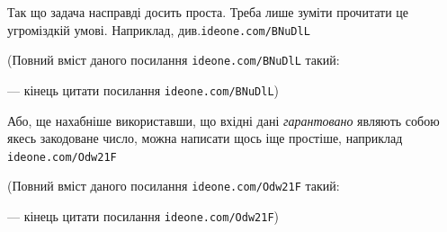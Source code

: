 \documentclass[14pt,a4paper]{extarticle}
\renewcommand{\baselinestretch}{1.3125}
\begin{document}
Так що задача насправді досить проста. Треба лише зуміти прочитати це у\nolinebreak[3] громіздкій умові. Наприклад, див.\nolinebreak[2] 
\verb"ideone.com/BNuDlL"


{\color{green}\begin{small}

\renewcommand{\baselinestretch}{0.875}

(Повний вміст даного посилання \verb"ideone.com/BNuDlL" такий:

--- кінець цитати посилання \verb"ideone.com/BNuDlL")

\end{small}}


\hspace{0.5em plus 1em} Або, ще нахабніше використавши, що вхідні дані \emph{гарантовано} являють собою якесь закодоване число, можна написати щось іще простіше, наприклад 
\verb"ideone.com/Odw21F"


{\color{green}\begin{small}

\renewcommand{\baselinestretch}{0.875}

(Повний вміст даного посилання \verb"ideone.com/Odw21F" такий:

--- кінець цитати посилання \verb"ideone.com/Odw21F")

\end{small}}
\end{document}
